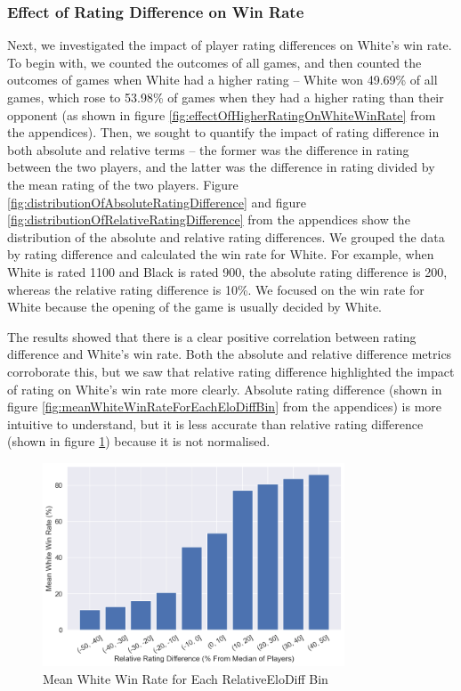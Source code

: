 \documentclass[a4paper, 11pt]{article}
\begin{document}
\subsubsection{Effect of Rating Difference on Win Rate}
Next, we investigated the impact of player rating differences on White's win rate. To begin with, we counted the outcomes of all games, and then counted the outcomes of games when White had a higher rating -- White won 49.69\% of all games, which rose to 53.98\% of games when they had a higher rating than their opponent (as shown in figure \ref{fig:effectOfHigherRatingOnWhiteWinRate} from the appendices). Then, we sought to quantify the impact of rating difference in both absolute and relative terms -- the former was the difference in rating between the two players, and the latter was the difference in rating divided by the mean rating of the two players. Figure \ref{fig:distributionOfAbsoluteRatingDifference} and figure \ref{fig:distributionOfRelativeRatingDifference} from the appendices show the distribution of the absolute and relative rating differences. We grouped the data by rating difference and calculated the win rate for White. For example, when White is rated 1100 and Black is rated 900, the absolute rating difference is 200, whereas the relative rating difference is 10\%. We focused on the win rate for White because the opening of the game is usually decided by White.

The results showed that there is a clear positive correlation between rating difference and White's win rate. Both the absolute and relative difference metrics corroborate this, but we saw that relative rating difference highlighted the impact of rating on White's win rate more clearly. Absolute rating difference (shown in figure \ref{fig:meanWhiteWinRateForEachEloDiffBin} from the appendices) is more intuitive to understand, but it is less accurate than relative rating difference (shown in figure \ref{fig:meanWhiteWinRateForEachRelativeEloDiffBin}) because it is not normalised.

\begin{figure}[H]
    \centering
    \caption{Mean White Win Rate for Each RelativeEloDiff Bin}
    \label{fig:meanWhiteWinRateForEachRelativeEloDiffBin}
    \includegraphics[width=0.8\textwidth]{Mean White Win Rate for Each RelativeEloDiff Bin.png}
\end{figure}
\end{document}
